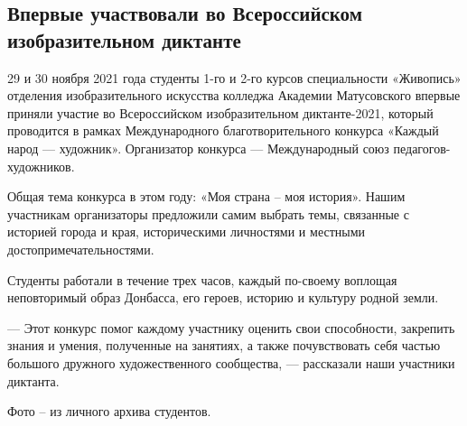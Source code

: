  
 
 
 
 
\subsection{Впервые участвовали во Всероссийском изобразительном диктанте}
\label{sec:30_11_2021.stz.edu.lnr.lgaki.1.diktant_konkurs_rossia}

29 и 30 ноября 2021 года студенты 1-го и 2-го курсов специальности «Живопись»
отделения изобразительного искусства колледжа Академии Матусовского впервые
приняли участие во Всероссийском изобразительном диктанте-2021, который
проводится в рамках Международного благотворительного конкурса «Каждый народ —
художник». Организатор конкурса — Международный союз педагогов-художников.


Общая тема конкурса в этом году: «Моя страна – моя история». Нашим участникам
организаторы предложили самим выбрать темы, связанные с историей города и края,
историческими личностями и местными достопримечательностями.

Студенты работали в течение трех часов, каждый по-своему воплощая неповторимый
образ Донбасса, его героев, историю и культуру родной земли.

— Этот конкурс помог каждому участнику оценить свои способности, закрепить
знания и умения, полученные на занятиях, а также почувствовать себя частью
большого дружного художественного сообщества, — рассказали наши участники
диктанта.

Фото – из личного архива студентов.

